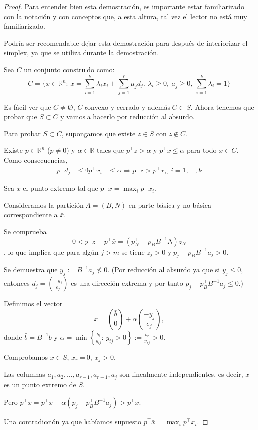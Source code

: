 \begin{proof}
Para entender bien esta demostración, es importante estar familiarizado con la notación y con conceptos que, a esta altura, tal vez el lector no está muy familiarizado.

Podría ser recomendable dejar esta demostración para después de interiorizar el simplex, ya que se utiliza durante la demostración.


Sea $C$ un conjunto construido como:
\[
C = \{x\in\mathbb{R}^n:\, x = \sum_{i=1}^k \lambda_i x_i + \sum_{j=1}^\ell
 \mu_j d_j,\ \lambda_i\geq 0,\ \mu_j\geq 0,\ \sum_{i=1}^k \lambda_i=1\}
\]

Es fácil ver que $C≠Ø$, $C$ convexo y cerrado y además $C\subset S$.
Ahora tenemos que probar que $S\subset C$ y vamos a hacerlo por reducción al absurdo.

Para probar $S\subset C$, supongamos que existe $z\in S$ con $z\notin C$.

Existe $p\in\mathbb{R}^n$ ($p\neq 0$) y $\alpha \in\mathbb{R}$ tales que $p^\top z>\alpha$ y $p^\top x\leq \alpha$ para todo $x\in C$.
Como consecuencias,
\begin{align*}
p^\top d_j &\leq 0
p^\top x_i &\leq \alpha \Rightarrow p^\top z > p^\top x_i,\ i=1,\ldots,k
\end{align*}

Sea $\bar{x}$ el punto extremo tal que $p^\top \bar{x} =\max_i p^\top x_i$.

Consideramos la partición $A=(B,N)$ en parte básica y no básica correspondiente  a $\bar{x}$.

Se comprueba \[0 < p^\top z- p^\top \bar{x}=(p_N^\top - p_B^\top B^{-1} N) z_N\], lo que implica que para algún $j>m$ se tiene $z_j>0$ y $p_j-p_B^\top B^{-1} a_j>0$.

Se demuestra  que $y_j:= B^{-1}a_j\nleq 0$. (Por reducción al absurdo ya que si $y_j\leq 0$, entonces $d_j= {-y_j\choose e_j}$ es una dirección extrema y por tanto $p_j-p_B^\top B^{-1}a_j\leq 0$.)


Definimos el vector
\[
x = {\bar{b}\choose 0} + \alpha {-y_j\choose e_j},
\]
donde $\bar{b} = B^{-1}b$ y $\alpha =\min\left\{\frac{\bar{b}_i}{y_{ij}}:\, y_{ij}>0 \right\}:= \frac{\bar{b}_r}{y_{rj}}>0$.


Comprobamos $x\in S$, $x_r=0$, $x_j>0$.

Las columnas $a_1,a_2,\ldots,a_{r-1},a_{r+1},a_j$
son linealmente independientes, es decir, $x$ es un punto extremo de $S$.


Pero $p^\top x = p^\top \bar{x} + \alpha (p_j-p_B^\top B^{-1}a_j)> p^\top \bar{x}$.

Una contradicción ya que habíamos supuesto $p^\top \bar{x} =\max_i p^\top x_i$.

\end{proof}



